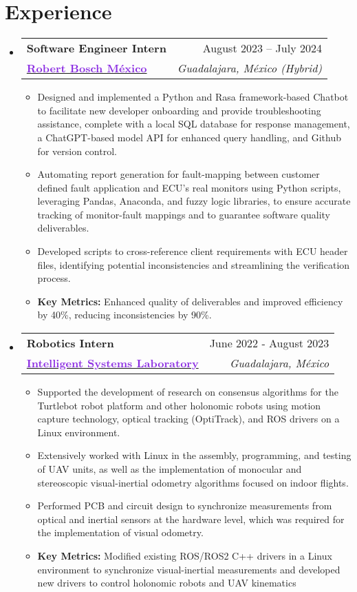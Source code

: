 \documentclass[a4paper,11pt]{article}
\makeatletter
\newcommand{\resumeItem}[1]{
  \item\small{
    {#1 \vspace{-2pt}}
  }
}
\newcommand{\resumeItemNoBullet}[1]{
  \item[]\small{
    {#1 \vspace{-2pt}}
  }
}
\newcommand{\resumeSubheadingNoItalics}[4]{
  \vspace{-2pt}\item
    \begin{tabular*}{1\textwidth}[t]{l@{\extracolsep{\fill}}r}
      \textbf{#1} & #2 \\
      \small#3 & \textit{\small #4} \\
    \end{tabular*}\vspace{-2pt}
}
\newcommand{\resumeSubHeadingListStart}{\begin{itemize}[leftmargin=0in, label={}]}
\newcommand{\resumeSubHeadingListEnd}{\end{itemize}}
\newcommand{\resumeItemListStart}{\begin{itemize}[leftmargin=0.15in, nosep]}
\newcommand{\resumeItemListEnd}{\end{itemize}\vspace{-2pt}}
\makeatother
\begin{document}
\section{\Large{Experience}}
  \resumeSubHeadingListStart
    \resumeSubheadingNoItalics
      {\large Software Engineer Intern}{August 2023 -- July 2024}
      {\href{https://bosch.com.mx}{\textcolor{BlueViolet}{\textbf{\large{Robert Bosch México}}}}}{Guadalajara, México (Hybrid)}
      \resumeItemListStart
        \resumeItem{Designed and implemented a Python and Rasa framework-based Chatbot to facilitate new developer onboarding and provide troubleshooting assistance, complete with a local SQL database for response management, a ChatGPT-based model API for enhanced query handling, and Github for version control.}
        \resumeItem{Automating report generation for fault-mapping between customer defined fault application and ECU's  real monitors using Python scripts, leveraging Pandas, Anaconda, and fuzzy logic libraries, to ensure accurate tracking of monitor-fault mappings and to guarantee software quality deliverables.}
        \resumeItem{Developed scripts to cross-reference client requirements with ECU header files, identifying potential inconsistencies and streamlining the verification process.}
        \resumeItemNoBullet{\textbf{Key Metrics:} Enhanced quality of deliverables and improved efficiency by 40\%, reducing inconsistencies by 90\%.}
      \resumeItemListEnd
    \vspace{-2pt}
    \resumeSubheadingNoItalics
      {\large Robotics Intern}{June 2022 - August 2023}
      {\href{https://www.cucei.udg.mx/carreras/robotica/es/laboratorios/ciber-fisicos}{\textcolor{BlueViolet}{\textbf{\large{Intelligent Systems Laboratory}}}}}{Guadalajara, México}
      \resumeItemListStart
        \resumeItem{Supported the development of research on consensus algorithms for the Turtlebot robot platform and other holonomic robots using motion capture technology, optical tracking (OptiTrack), and ROS drivers on a Linux environment.}
        \resumeItem{Extensively worked with Linux in the assembly, programming, and testing of UAV units, as well as the implementation of monocular and stereoscopic visual-inertial odometry algorithms focused on indoor flights.}
        \resumeItem{Performed PCB and circuit design to synchronize measurements from optical and inertial sensors at the hardware level, which was required for the implementation of visual odometry.}
        \resumeItemNoBullet{\textbf{Key Metrics:} Modified existing ROS/ROS2 C++ drivers in a Linux environment to synchronize visual-inertial measurements and developed new drivers to control holonomic robots and UAV kinematics}
      \resumeItemListEnd
  \resumeSubHeadingListEnd
\vspace{-12pt}
\end{document}
